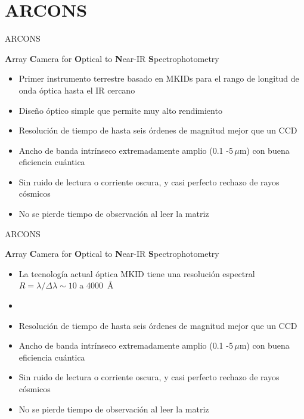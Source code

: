 \documentclass[ignorenonframetext,12pt]{beamer}
\begin{document}
\section{ARCONS}
\begin{frame}{ARCONS}

				\textbf{A}rray \textbf{C}amera for \textbf{O}ptical to \textbf{N}ear-IR
				\textbf{S}pectrophotometry
				\begin{itemize}
								\item Primer instrumento terrestre basado en MKIDs para el rango de
												longitud de onda óptica hasta el IR cercano
								\item Diseño óptico simple que permite muy alto rendimiento
								\item Resolución de tiempo de hasta seis órdenes de magnitud
												mejor que un CCD
								\item Ancho de banda intrínseco extremadamente amplio (0.1
												-5\,$\mu$m) con buena eficiencia cuántica
								\item Sin ruido de lectura o corriente oscura, y casi perfecto
												rechazo de rayos cósmicos
								\item No se pierde tiempo de observación al leer la matriz
				\end{itemize}

\end{frame}
\begin{frame}{ARCONS}

				\textbf{A}rray \textbf{C}amera for \textbf{O}ptical to \textbf{N}ear-IR
				\textbf{S}pectrophotometry
				\begin{itemize}
								\item La tecnología actual óptica MKID tiene una resolución
												espectral $R = \lambda/\Delta \lambda \sim 10$ a
												\SI{4000}{\angstrom}
								\item 
								\item Resolución de tiempo de hasta seis órdenes de magnitud
												mejor que un CCD
								\item Ancho de banda intrínseco extremadamente amplio (0.1
												-5\,$\mu$m) con buena eficiencia cuántica
								\item Sin ruido de lectura o corriente oscura, y casi perfecto
												rechazo de rayos cósmicos
								\item No se pierde tiempo de observación al leer la matriz
				\end{itemize}

\end{frame}
\end{document}
